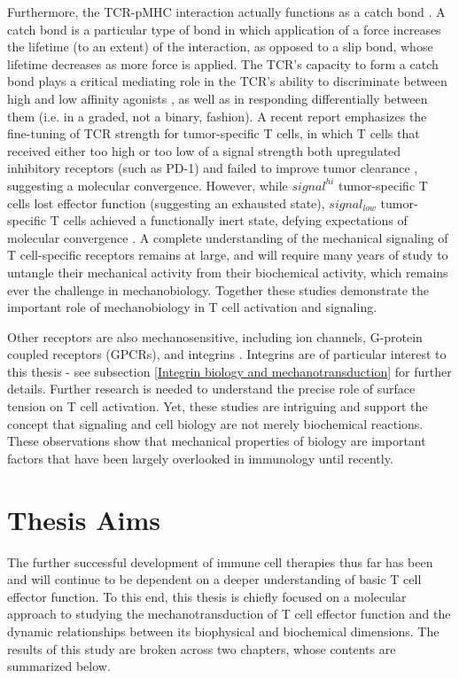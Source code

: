 Furthermore, the TCR-pMHC interaction actually functions as a catch bond \cite{Liu2014}. A catch bond is a particular type of bond in which application of a force increases the lifetime (to an extent) of the interaction, as opposed to a slip bond, whose lifetime decreases as more force is applied. The TCR's capacity to form a catch bond plays a critical mediating role in the TCR's ability to discriminate between high and low affinity agonists \cite{Liu2014}, as well as in responding differentially between them (i.e. in a graded, not a binary, fashion). A recent report emphasizes the fine-tuning of TCR strength for tumor-specific T cells, in which T cells that received either too high or too low of a signal strength  both upregulated inhibitory receptors (such as PD-1) and failed to improve tumor clearance \cite{Shakiba2021}, suggesting a molecular convergence. However, while $signal^{hi}$ tumor-specific T cells lost effector  function (suggesting an exhausted state), $signal_{low}$ tumor-specific T cells achieved a functionally inert state, defying expectations of molecular convergence \cite{Shakiba2021}. A complete understanding of the mechanical signaling of T cell-specific receptors remains at large, and will require many years of study to untangle their mechanical activity from their biochemical activity, which remains ever the challenge in mechanobiology. Together these studies demonstrate the important role of mechanobiology in T cell activation and signaling.

Other receptors are also mechanosensitive, including ion channels, G-protein coupled receptors (GPCRs), and integrins \cite{Moroni, Iliff2018, Sun2016}. Integrins are of particular interest to this thesis - see subsection \ref{Integrin biology and mechanotransduction} for further details. Further research is needed to understand the precise role of surface tension on T cell activation. Yet, these studies are intriguing and support the concept that signaling and cell biology are not merely biochemical reactions. These observations show that mechanical properties of biology are important factors that have been largely overlooked in immunology until recently. 

\section{Thesis Aims}
The further successful development of immune cell therapies thus far has been and will continue to be dependent on a deeper understanding of basic T cell effector function. To this end, this thesis is chiefly focused on a molecular approach to studying the mechanotransduction of T cell effector function and the dynamic relationships between its biophysical and biochemical dimensions. The results of this study are broken across two chapters, whose contents are summarized below.

